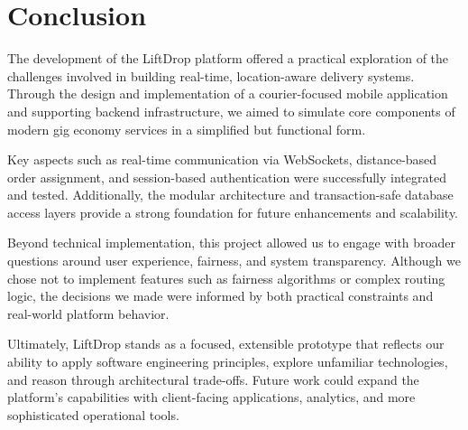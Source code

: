 \section{Conclusion}

The development of the LiftDrop platform offered a practical exploration of the challenges involved in building real-time, location-aware delivery systems. Through the design and implementation of a courier-focused mobile application and supporting backend infrastructure, we aimed to simulate core components of modern gig economy services in a simplified but functional form.

Key aspects such as real-time communication via WebSockets, distance-based order assignment, and session-based authentication were successfully integrated and tested. Additionally, the modular architecture and transaction-safe database access layers provide a strong foundation for future enhancements and scalability.

Beyond technical implementation, this project allowed us to engage with broader questions around user experience, fairness, and system transparency. Although we chose not to implement features such as fairness algorithms or complex routing logic, the decisions we made were informed by both practical constraints and real-world platform behavior.

Ultimately, LiftDrop stands as a focused, extensible prototype that reflects our ability to apply software engineering principles, explore unfamiliar technologies, and reason through architectural trade-offs. Future work could expand the platform’s capabilities with client-facing applications, analytics, and more sophisticated operational tools.
